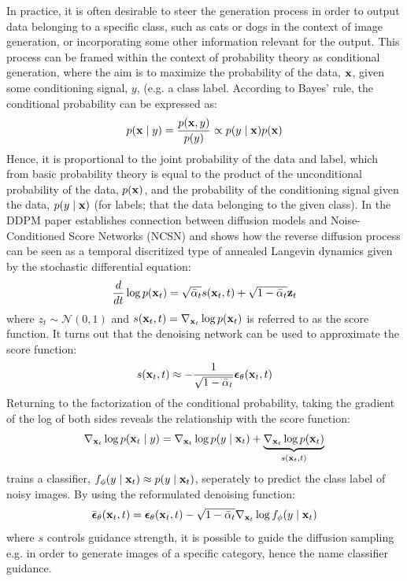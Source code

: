 In practice, it is often desirable to steer the generation process in order to output data belonging to a specific class, such as cats or dogs in the context of image generation, or incorporating some other information relevant for the output. This process can be framed within the context of probability theory as conditional generation, where the aim is to maximize the probability of the data, $\boldsymbol{\mathbf{x}}$, given some conditioning signal, $y$, (e.g. a class label. According to Bayes' rule, the conditional probability can be expressed as:
\begin{equation}
    p(\boldsymbol{\mathbf{x}} \mid y) = \frac{p(\boldsymbol{\mathbf{x}}, y)}{p(y)} \propto p(y \mid \boldsymbol{\mathbf{x}}) p(\boldsymbol{\mathbf{x}})
\end{equation}
Hence, it is proportional to the joint probability of the data and label, which from basic probability theory is equal to the product of the unconditional probability of the data, $p(\boldsymbol{\mathbf{x}})$, and the probability of the conditioning signal given the data, $p(y \mid \boldsymbol{\mathbf{x}})$ (for labels; that the data belonging to the given class). In the DDPM paper \cite{ho2020denoising} establishes connection between diffusion models and Noise-Conditioned Score Networks (NCSN) and shows how the reverse diffusion process can be seen as a temporal discritized type of annealed Langevin dynamics given by the stochastic differential equation:
\begin{equation}
    \frac{d}{dt} \log p(\boldsymbol{\mathbf{x}}_t) = \sqrt{\bar{\alpha}_t} s(\boldsymbol{\mathbf{x}}_t, t) + \sqrt{1 - \bar{\alpha}_t} \boldsymbol{\mathbf{z}}_t
\end{equation}
where $z_t \sim \mathcal{N}(0, 1)$ and $s(\boldsymbol{\mathbf{x}}_t, t) = \nabla_{\boldsymbol{\mathbf{x}}_t} \log p(\boldsymbol{\mathbf{x}}_t)$ is referred to as the score function. It turns out that the denoising network can be used to approximate the score function:
\begin{equation}
    s(\boldsymbol{\mathbf{x}}_t, t) \approx -\frac{1}{\sqrt{1 - \bar{\alpha}_t}} \boldsymbol{\mathbf{\epsilon}}_\theta(\boldsymbol{\mathbf{x}}_t, t)
\end{equation}
Returning to the factorization of the conditional probability, taking the gradient of the log of both sides reveals the relationship with the score function:
\begin{equation}
    \nabla_{\boldsymbol{\mathbf{x}}_t} \log p(\boldsymbol{\mathbf{x}}_t \mid y ) = \nabla_{\boldsymbol{\mathbf{x}}_t} \log p(y \mid \boldsymbol{\mathbf{x}}_t) + \underbrace{\nabla_{\boldsymbol{\mathbf{x}}_t} \log p(\boldsymbol{\mathbf{x}}_t)}_{s(\boldsymbol{\mathbf{x}}_t, t)}
\end{equation}
\cite{dharial2021diffusion} trains a classifier, $f_\phi(y \mid \boldsymbol{\mathbf{x}}_t) \approx p(y \mid \boldsymbol{\mathbf{x}}_t)$, seperately to predict the class label of noisy images. By using the reformulated denoising function:
\begin{equation}
    \bar{\boldsymbol{\mathbf{\epsilon}}}_{\theta}(\boldsymbol{\mathbf{x}}_t, t) = \boldsymbol{\mathbf{\epsilon}}_\theta(\boldsymbol{\mathbf{x}}_t, t) - \sqrt{1 - \bar{\alpha}_t} \nabla_{\boldsymbol{\mathbf{x}}_t} \log f_\phi(y \mid \boldsymbol{\mathbf{x}}_t)
\end{equation}
where $s$ controls guidance strength, it is possible to guide the diffusion sampling e.g. in order to generate images of a specific category, hence the name classifier guidance. 

